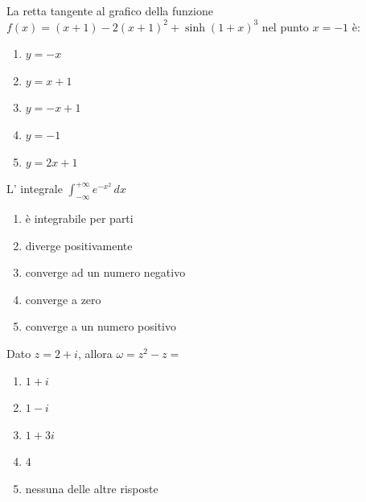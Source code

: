 \begin{quiz}
La retta tangente al grafico della funzione $f(x)=(x+1)-2(x+1)^2+\sinh(1+x)^3$ nel punto $x=-1$ \`e:
\begin{enumerate}
\item $y=-x$
\item $y=x+1$
\item $y=-x+1$
\item $y=-1$
\item $y=2x+1$
\end{enumerate}
\end{quiz}

\begin{quiz}
L' integrale $\displaystyle\int_{-\infty}^{+\infty}e^{-x^2}\,dx$
\begin{enumerate}
\item \`e integrabile per parti
\item diverge positivamente
\item converge ad un numero negativo
\item converge a zero
\item converge a un numero positivo
\end{enumerate}
\end{quiz}

\begin{quiz}
Dato $z=2+i$, allora $\omega=z^2-z=$
\begin{enumerate}
\item $1+i$
\item $1-i$
\item $1+3i$
\item $4$
\item nessuna delle altre risposte
\end{enumerate}
\end{quiz}

